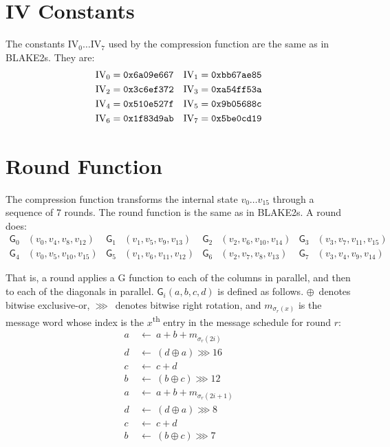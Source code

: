 \documentclass[11pt,notitlepage,a4paper]{article}
\newcommand{\GG}{\mathsf{G}}
\newcommand{\IV}{\text{IV}}
\begin{document}
\begin{appendices}

\section{IV Constants}\label{sec:ivconstants}

    The constants $\IV_0 \ldots \IV_7$ used by the compression function are the
    same as in BLAKE2s. They are:
\begin{align*}
    \IV_0 &= \text{\texttt{0x6a09e667}} &
    \IV_1 &= \text{\texttt{0xbb67ae85}} \\
    \IV_2 &= \text{\texttt{0x3c6ef372}} &
    \IV_3 &= \text{\texttt{0xa54ff53a}} \\
    \IV_4 &= \text{\texttt{0x510e527f}} &
    \IV_5 &= \text{\texttt{0x9b05688c}} \\
    \IV_6 &= \text{\texttt{0x1f83d9ab}} &
    \IV_7 &= \text{\texttt{0x5be0cd19}}
\end{align*}

\section{Round Function}\label{sec:roundfn}

    The compression function transforms the internal state $v_{0} \ldots
    v_{15}$ through a sequence of 7 rounds. The round function is the same as
    in BLAKE2s. A round does:
\begin{align*}
    \GG_{0}&(v_{0}, v_{4}, v_{8}, v_{12}) &
    \GG_{1}&(v_{1}, v_{5}, v_{9}, v_{13}) &
    \GG_{2}&(v_{2}, v_{6}, v_{10}, v_{14}) &
    \GG_{3}&(v_{3}, v_{7}, v_{11}, v_{15}) \\
    \GG_{4}&(v_{0}, v_{5}, v_{10}, v_{15}) &
    \GG_{5}&(v_{1}, v_{6}, v_{11}, v_{12}) &
    \GG_{6}&(v_{2}, v_{7}, v_{8}, v_{13}) &
    \GG_{7}&(v_{3}, v_{4}, v_{9}, v_{14})
\end{align*}

    That is, a round applies a G function to each of the columns in parallel,
    and then to each of the diagonals in parallel. $\GG_i(a, b, c, d)$ is
    defined as follows. $\oplus$~denotes bitwise exclusive-or, $\ggg$~denotes
    bitwise right rotation, and $m_{\sigma_r(x)}$ is the message word whose
    index is the $x$\textsuperscript{th} entry in the message schedule for
    round $r$:
\begin{align*}
    a \ & \leftarrow \ a + b + m_{\sigma_r(2i)} \\
    d \ & \leftarrow \ (d \oplus a) \ggg 16 \\
    c \ & \leftarrow \ c + d \\
    b \ & \leftarrow \ (b \oplus c) \ggg 12 \\
    a \ & \leftarrow \ a + b + m_{\sigma_r(2i+1)} \\
    d \ & \leftarrow \ (d \oplus a) \ggg 8 \\
    c \ & \leftarrow \ c + d \\
    b \ & \leftarrow \ (b \oplus c) \ggg 7
\end{align*}


\end{appendices}
\end{document}
